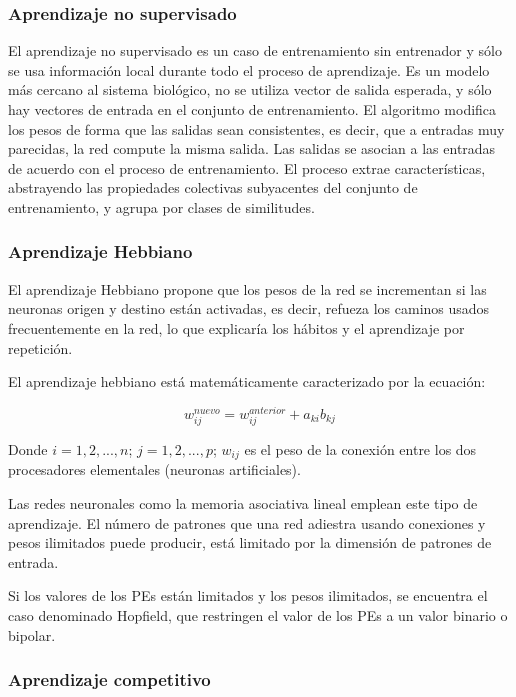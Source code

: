 \subsubsection{Aprendizaje no supervisado}

El aprendizaje no supervisado es un caso de entrenamiento sin entrenador y sólo
se usa información local durante todo el proceso de aprendizaje. Es un modelo
más cercano al sistema biológico, no se utiliza vector de salida esperada, y
sólo hay vectores de entrada en el conjunto de entrenamiento. El algoritmo
modifica los pesos de forma que las salidas sean consistentes, es decir, que a
entradas muy parecidas, la red compute la misma salida.  Las salidas se asocian
a las entradas de acuerdo con el proceso de entrenamiento. El proceso extrae
características, abstrayendo las propiedades colectivas subyacentes del
conjunto de entrenamiento, y agrupa por clases de similitudes.

\subsubsection{Aprendizaje Hebbiano}

El aprendizaje Hebbiano propone que los pesos de la red se incrementan si las
neuronas origen y destino están activadas, es decir, refueza los caminos usados
frecuentemente en la red, lo que explicaría los hábitos y el aprendizaje por
repetición.

El aprendizaje hebbiano está matemáticamente caracterizado por la ecuación:

$$ w_{ij}^{nuevo} = w_{ij}^{anterior} + a_{ki}b_{kj} $$

Donde $i = 1,2,...,n$; $j=1,2,...,p$; $w_{ij}$ es el peso de la conexión entre
los dos procesadores elementales (neuronas artificiales).

Las redes neuronales como la memoria asociativa lineal emplean este tipo de
aprendizaje. El número de patrones que una red adiestra usando conexiones y
pesos ilimitados puede producir, está limitado por la dimensión de patrones de
entrada.

Si los valores de los PEs están limitados y los pesos ilimitados, se encuentra
el caso denominado Hopfield, que restringen el valor de los PEs a un valor
binario o bipolar.  

\subsubsection{Aprendizaje competitivo}

